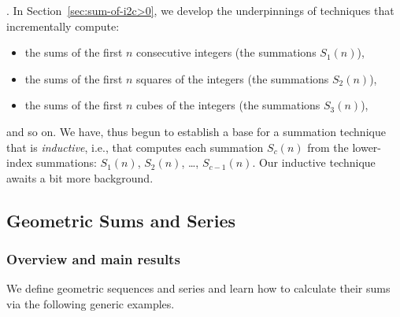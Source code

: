 %

\bigskip

.
In Section~\ref{sec:sum-of-i2c>0}, we develop the underpinnings of
techniques that incrementally compute:
\begin{itemize}
\item
the sums of the first $n$ consecutive integers (the summations $S_1(n)$), 
\medskip\item
the sums of the first $n$ squares of the integers (the summations $S_2(n)$), 
\medskip\item
the sums of the first $n$ cubes of the integers (the summations $S_3(n)$),
\end{itemize}
and so on.  We have, thus begun to establish a base for a summation technique that is {\em inductive}, i.e., that computes each summation $S_c(n)$ from the lower-index summations: $S_1(n)$, $S_2(n)$, \ldots, $S_{c-1}(n)$.  Our inductive technique awaits a bit more background.


\subsection{Geometric Sums and Series}
\label{sec:general-geometric-series}
\label{sec:geometric-sums}
\label{sec:general-geometric-sums}

\subsubsection{Overview and main results}

We define geometric sequences and series and learn how to calculate their sums via the following generic examples.

